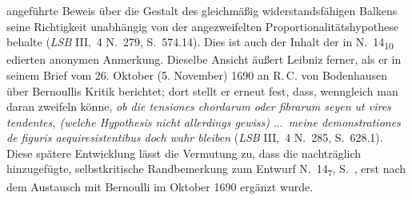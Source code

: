 angeführte Beweis über die Gestalt des gleichmäßig widerstandsfähigen Balkens seine Richtigkeit unabhängig von der angezweifelten Proportionalitätshypothese behalte
(\cite{01260}\textit{LSB} III,~4 N.~279, S.~574.14).
Dies ist auch der Inhalt der in N.~14\textsubscript{10} edierten %
anonymen Anmerkung.
Dieselbe Ansicht äußert Leibniz ferner, als er in seinem Brief vom 26. Oktober (5. November) 1690 an R.\,C. von Bodenhausen\protect{} über Bernoullis Kritik berichtet;\protect{}
dort stellt er erneut fest, dass, wenngleich man daran zweifeln könne, \textit{ob die tensiones chordarum oder fibrarum seyen ut vires tendentes, (welche Hypothesis nicht allerdings gewiss)} \lbrack...\rbrack\ \textit{meine demonstrationes de figuris aequiresistentibus doch wahr bleiben} (\cite{01261}\textit{LSB} III,~4 N.~285, S.~628.1).%
\pend%
\pstart%
Diese spätere Entwicklung lässt die Vermutung zu, dass die nachträglich hinzugefügte, selbstkritische Randbemerkung zum Entwurf N.~14\textsubscript{7}, S.~, erst nach dem Austausch mit Bernoulli im Oktober 1690 ergänzt wurde.
\pend%
% 
% 
\normalsize
%
%
\frenchspacing%
%
%
